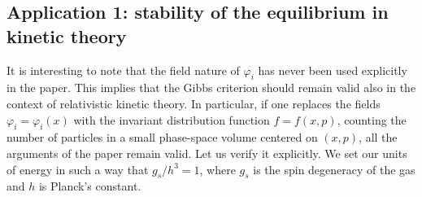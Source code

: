 \documentclass[a4paper, amsfonts, amssymb, amsmath, reprint, showkeys, nofootinbib, twoside, onecolumn,notitlepage]{revtex4-1}
\begin{document}
%
%




 \subsection{Application 1: stability of the equilibrium in kinetic theory}

It is interesting to note that the field nature of $\varphi_i$ has never been used explicitly in the paper. This implies that the Gibbs criterion should remain valid also in the context of relativistic kinetic theory. In particular, if one replaces the fields $\varphi_i=\varphi_i(x)$ with the invariant distribution function $f=f(x,p)$, counting the number of particles in a small phase-space volume centered on $(x,p)$, all the arguments of the paper remain valid. Let us verify it explicitly. We set our units of energy in such a way that $g_s/h^3 =1$, where $g_s$ is the spin degeneracy of the gas and $h$ is Planck's constant. 
\end{document}
